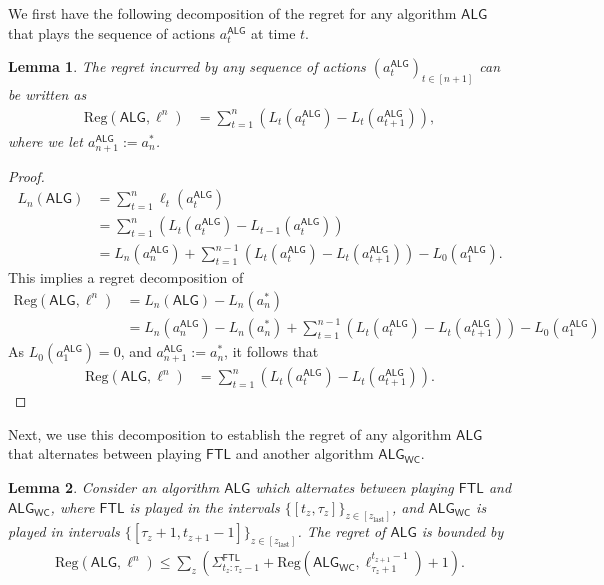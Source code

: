 \documentclass[twoside]{article}
\newtheorem{lemma}{Lemma}
\newcommand{\Reg}{\mathrm{Reg}}
\newcommand{\wcalg}{\mathsf{ALG}_{\mathsf{WC}}}
\newcommand{\zlast}{z_{\mathrm{last}}}
\newcommand{\ftl}{\mathsf{FTL}}
\newcommand{\alg}{\mathsf{ALG}}
\newcommand{\ftlsum}{\Sigma^{\mathsf{FTL}}}
\begin{document}
We first have the following decomposition of the regret for any algorithm $\alg$ that plays the sequence of actions $a^{\alg}_t$ at time $t$.
\begin{lemma} \label{regret_decomp}
The regret incurred by any sequence of actions $(a^\alg_t)_{t\in[n+1]}$ can be written as
\begin{align}
\Reg(\alg, \ell^n)
&= \sum_{t=1}^{n} \left(L_t(a^{\alg}_t) - L_{t}(a^{\alg}_{t+1}) \right),
\end{align}
where we let $a_{n+1}^{\alg} := a_n^*$.
\end{lemma}

\begin{proof}
\begin{align}
L_n(\alg)
&= \sum_{t=1}^n \ell_t(a^{\alg}_t) \\
&= \sum_{t=1}^n \left(L_t(a^{\alg}_t) - L_{t-1}(a^{\alg}_t) \right) \\
&= L_n(a^{\alg}_n) + \sum_{t=1}^{n-1} \left(L_t(a^{\alg}_t) - L_{t}(a^{\alg}_{t+1}) \right) - L_0(a^{\alg}_1).
\end{align}
This implies a regret decomposition of
\begin{align}
\Reg(\alg, \ell^n)
&= L_n(\alg) - L_n(a_n^*) \\
&= L_n(a^{\alg}_n) - L_n(a_n^*) + \sum_{t=1}^{n-1} \left(L_t(a^{\alg}_t) - L_{t}(a^{\alg}_{t+1}) \right) - L_0(a^{\alg}_1)
\end{align}
As $L_0(a^{\alg}_1) = 0$, and $a_{n+1}^{\alg} := a_n^*$, it follows that 
\begin{align}
\Reg(\alg, \ell^n)
&= \sum_{t=1}^{n} \left(L_t(a^{\alg}_t) - L_{t}(a^{\alg}_{t+1}) \right).
\end{align}
\end{proof}

Next, we use this decomposition to establish the regret of any algorithm $\alg$ that alternates between playing $\ftl$ and another algorithm $\wcalg$.

\begin{lemma} \label{small_loss_regret_lemma}
Consider an algorithm $\alg$ which alternates between playing $\ftl$ and $\wcalg$, where $\ftl$ is played in the intervals $\{[t_z, \tau_z]\}_{z\in[\zlast]}$, and $\wcalg$ is played in intervals $\{[\tau_z +1, t_{z+1}-1]\}_{z\in[\zlast]}$. The regret of $\alg$ is bounded by
\begin{align}
\Reg(\alg, \ell^n) \leq
\sum_z \left(\ftlsum_{t_z:\tau_z-1} + \Reg(\wcalg, \ell_{\tau_z+1}^{t_{z+1}-1}) + 1\right).
\end{align}
\end{lemma}
\end{document}
